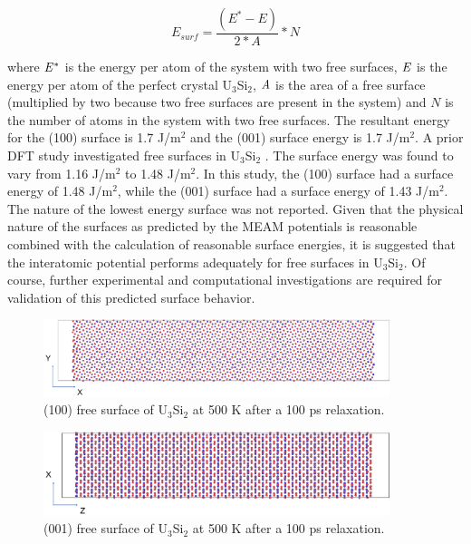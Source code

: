 \documentclass[review]{elsarticle}
\begin{document}
\begin{equation}
\label{eq:surface}
E_{surf}= \frac{(E^{*} - E)}{2*A} * N
\end{equation}

where $\it{E^{*}}$ is the energy per atom of the system with two free surfaces, $\it{E}$ is the energy per atom of the perfect crystal U$_{3}$Si$_{2}$, $\it{A}$ is the area of a free surface (multiplied by two because two free surfaces are present in the system) and $\textit{N}$ is the number of atoms in the system with two free surfaces.  The resultant energy for the (100) surface is 1.7 J/m$^{2}$ and the (001) surface energy is 1.7 J/m$^{2}$.  A prior DFT study investigated free surfaces in U$_{3}$Si$_{2}$ \cite{anl_report}.  The surface energy was found to vary from 1.16 J/m$^{2}$ to 1.48 J/m$^{2}$.  In this study, the (100) surface had a surface energy of 1.48 J/m$^{2}$, while the (001) surface had a surface energy of 1.43 J/m$^{2}$.  The nature of the lowest energy surface was not reported.  Given that the physical nature of the surfaces as predicted by the MEAM potentials is reasonable combined with the calculation of reasonable surface energies, it is suggested that the interatomic potential performs adequately for free surfaces in U$_{3}$Si$_{2}$.  Of course, further experimental and computational investigations are required for validation of this predicted surface behavior.  

\begin{figure}[bt]
	\centering
	\includegraphics[width=0.9\textwidth]{100KK1a.png}
    \caption{(100) free surface of U$_{3}$Si$_{2}$ at 500 K after a 100 ps relaxation.}\label{fig:ben7}
\end{figure}

\begin{figure}[bt]
	\centering
	\includegraphics[width=0.9\textwidth]{001KK1a.png}
    \caption{(001) free surface of U$_{3}$Si$_{2}$ at 500 K after a 100 ps relaxation. }\label{fig:ben8}
\end{figure}
\end{document}
